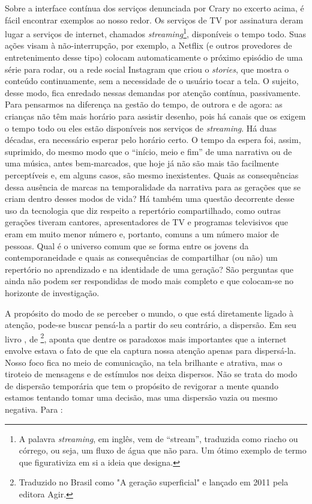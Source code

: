Sobre a interface contínua dos serviços denunciada por Crary no excerto acima, é fácil encontrar exemplos ao nosso redor. Os serviços de TV por assinatura deram lugar a serviços de internet, chamados \textit{streaming}\footnote{A palavra \textit{streaming}, em inglês, vem de \enquote{stream}, traduzida como riacho ou córrego, ou seja, um fluxo de água que não para. Um ótimo exemplo de termo que figurativiza em si a ideia que designa.}, disponíveis o tempo todo. Suas ações visam à não-interrupção, por exemplo, a Netflix (e outros provedores de entretenimento desse tipo) colocam automaticamente o próximo episódio de uma série para rodar, ou a rede social Instagram que criou o \textit{stories}, que mostra o conteúdo continuamente, sem a necessidade de o usuário tocar a tela. O sujeito, desse modo, fica enredado nessas demandas por atenção contínua, passivamente. Para pensarmos na diferença na gestão do tempo, de outrora e de agora: as crianças não têm mais horário para assistir desenho, pois há canais que os exigem o tempo todo ou eles estão disponíveis nos serviços de \textit{streaming}. Há duas décadas, era necessário esperar pelo horário certo. O tempo da espera foi, assim, suprimido, do mesmo modo que o “início, meio e fim” de uma narrativa ou de uma música, antes bem-marcados, que hoje já não são mais tão facilmente perceptíveis e, em alguns casos, são mesmo inexistentes. Quais as consequências dessa ausência de marcas na temporalidade da narrativa para as gerações que se criam dentro desses modos de vida? Há também uma questão decorrente desse uso da tecnologia que diz respeito a repertório compartilhado, como outras gerações tiveram cantores, apresentadores de TV e programas televisivos que eram em muito menor número e, portanto, comuns a um número maior de pessoas. Qual é o universo comum que se forma entre os jovens da contemporaneidade e quais as consequências de compartilhar (ou não) um repertório no aprendizado e na identidade de uma geração? São perguntas que ainda não podem ser respondidas de modo mais completo e que colocam-se no horizonte de investigação.

A propósito do modo de se perceber o mundo, o que está diretamente ligado à atenção, pode-se buscar pensá-la a partir do seu contrário, a dispersão. Em seu livro , de \textcite{carr2010}\footnote{Traduzido no Brasil como "A geração superficial" e lançado em 2011 pela editora Agir.}, aponta que dentre os paradoxos mais importantes que a internet envolve estava o fato de que ela captura nossa atenção apenas para dispersá-la. Nosso foco fica no meio de comunicação, na tela brilhante e atrativa, mas o tiroteio de mensagens e de estímulos nos deixa dispersos. Não se trata do modo de dispersão temporária que tem o propósito de revigorar a mente quando estamos tentando tomar uma decisão, mas uma dispersão vazia ou mesmo negativa. Para \textcite[p. 119, tradução nossa]{carr2010}:

